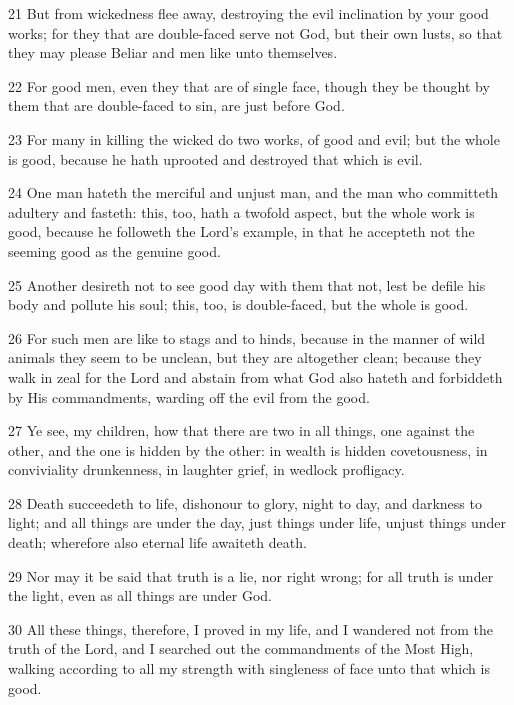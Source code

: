 \par 21 But from wickedness flee away, destroying the evil inclination by your good works; for they that are double-faced serve not God, but their own lusts, so that they may please Beliar and men like unto themselves.

\par 22 For good men, even they that are of single face, though they be thought by them that are double-faced to sin, are just before God.

\par 23 For many in killing the wicked do two works, of good and evil; but the whole is good, because he hath uprooted and destroyed that which is evil.

\par 24 One man hateth the merciful and unjust man, and the man who committeth adultery and fasteth: this, too, hath a twofold aspect, but the whole work is good, because he followeth the Lord's example, in that he accepteth not the seeming good as the genuine good.

\par 25 Another desireth not to see good day with them that not, lest be defile his body and pollute his soul; this, too, is double-faced, but the whole is good.

\par 26 For such men are like to stags and to hinds, because in the manner of wild animals they seem to be unclean, but they are altogether clean; because they walk in zeal for the Lord and abstain from what God also hateth and forbiddeth by His commandments, warding off the evil from the good.

\par 27 Ye see, my children, how that there are two in all things, one against the other, and the one is hidden by the other: in wealth is hidden covetousness, in conviviality drunkenness, in laughter grief, in wedlock profligacy.

\par 28 Death succeedeth to life, dishonour to glory, night to day, and darkness to light; and all things are under the day, just things under life, unjust things under death; wherefore also eternal life awaiteth death.

\par 29 Nor may it be said that truth is a lie, nor right wrong; for all truth is under the light, even as all things are under God.

\par 30 All these things, therefore, I proved in my life, and I wandered not from the truth of the Lord, and I searched out the commandments of the Most High, walking according to all my strength with singleness of face unto that which is good.

